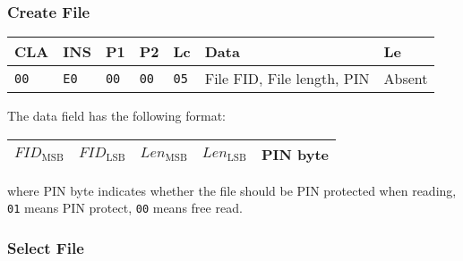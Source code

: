 \documentclass{article}
\begin{document}
\subsubsection{Create File}

\begin{flushleft}
\begin{tabular}{|l|l|l|l|l|l|l|}
\hline
CLA & INS & P1 & P2 & Lc & Data & Le \\
\hline
\texttt{00} & \texttt{E0} & \texttt{00} & \texttt{00} &
\texttt{05} & File FID, File length, PIN  & Absent \\
\hline
\end{tabular}
\end{flushleft}
The data field has the following format:
\begin{flushleft}
\begin{tabular}{|l|l|l|l|l|}
\hline
$\mathit{FID}_{\mathrm{MSB}}$ & $\mathit{FID}_{\mathrm{LSB}}$ &
$\mathit{Len}_{\mathrm{MSB}}$ & $\mathit{Len}_{\mathrm{LSB}}$ &
PIN byte \\
\hline
\end{tabular}
\end{flushleft}
where PIN byte indicates whether the file should be PIN protected when
reading, \texttt{01} means PIN protect, \texttt{00} means free read.

\subsubsection{Select File}\label{sec:select}
\end{document}
